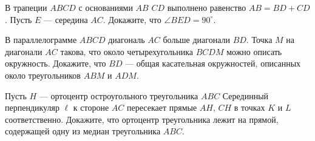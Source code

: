 \begin{tasks}
    \item {}

    \item В трапеции $ABCD$ с основаниями $AB$ $CD$ выполнено равенство  $AB = BD+CD$. Пусть $𝐸$ --- середина $𝐴𝐶$. Докажите, что $\angle BED = 90^\circ$.

    \item В параллелограмме $ABCD$ диагональ $AC$ больше диагонали $BD$. Точка $M$ на диагонали $AC$ такова, что около четырехугольника $BCDM$ можно описать окружность. Докажите, что $BD$ --- общая касательная окружностей, описанных около треугольников $ABM$ и $ADM$.

    \item {}

    \item Пусть $H$ --- ортоцентр остроугольного треугольника $ABC$ Серединный перпендикуляр $\ell$ к стороне $AC$ пересекает прямые $AH$, $CH$ в точках $K$ и $L$ соответственно. Докажите, что ортоцентр треугольника  лежит на прямой, содержащей одну из медиан треугольника $ABC$.

    \end{tasks}
